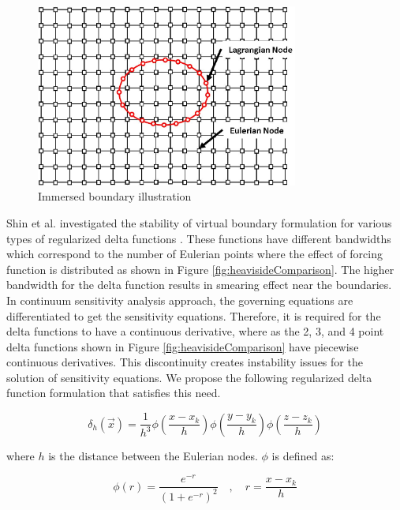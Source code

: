 \documentclass[12pt]{aiaa-pretty}
\begin{document}
%
\begin{figure}[H]
	\centering
	\includegraphics[height=6.0cm]{figure/immerdBoundary.jpg}
	\caption{Immersed boundary illustration}
	\label{fig:immersedBoundary}
\end{figure}
%

Shin et al. investigated the stability of virtual boundary formulation for various types of regularized delta functions \cite{shin2008assessment}. These functions have different bandwidths which correspond to the number of Eulerian points where the effect of forcing function is distributed as shown in Figure \ref{fig:heavisideComparison}. The higher bandwidth for the delta function results in smearing effect near the boundaries. In continuum sensitivity analysis approach, the governing equations are differentiated to get the sensitivity equations. Therefore, it is required for the delta functions to have a continuous derivative, where as the 2, 3, and 4 point delta functions shown in Figure \ref{fig:heavisideComparison} have piecewise continuous derivatives. This discontinuity creates instability issues for the solution of sensitivity equations. We propose the following regularized delta function formulation that satisfies this need.

%
\begin{equation}\label{eq:heavisideFunction}
	\delta_h(\vec{x}) = \frac{1}{h^3} \phi \left( \frac{x - x_k}{h} \right)
									 \phi \left( \frac{y - y_k}{h} \right)
									 \phi \left( \frac{z - z_k}{h} \right)
\end{equation}
%

where $h$ is the distance between the Eulerian nodes. $\phi$ is defined as:

%
\begin{equation}\label{eq:continuousDeltaFunction}
	\phi(r) = \frac{e^{-r}}{\left( 1 + e^{-r} \right)^2} \quad , \quad r = \frac{x - x_k}{h}
\end{equation}
%
\end{document}
